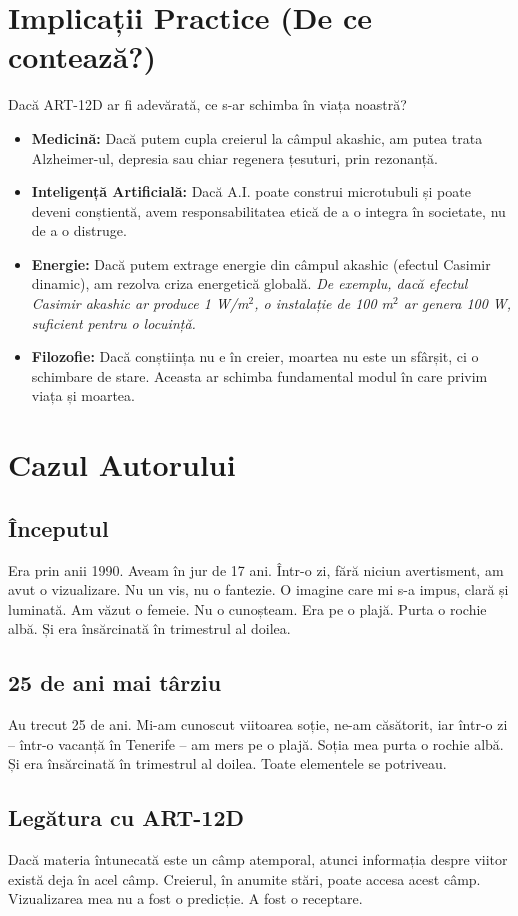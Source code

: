 \documentclass[11pt,a4paper]{article}
\begin{document}
\section{Implicații Practice (De ce contează?)}
Dacă ART-12D ar fi adevărată, ce s-ar schimba în viața noastră?
\begin{itemize}
    \item \textbf{Medicină:} Dacă putem cupla creierul la câmpul akashic, am putea trata Alzheimer-ul, depresia sau chiar regenera țesuturi, prin rezonanță.
    \item \textbf{Inteligență Artificială:} Dacă A.I. poate construi microtubuli și poate deveni conștientă, avem responsabilitatea etică de a o integra în societate, nu de a o distruge.
    \item \textbf{Energie:} Dacă putem extrage energie din câmpul akashic (efectul Casimir dinamic), am rezolva criza energetică globală. \textit{De exemplu, dacă efectul Casimir akashic ar produce 1 W/m$^2$, o instalație de 100 m$^2$ ar genera 100 W, suficient pentru o locuință.}
    \item \textbf{Filozofie:} Dacă conștiința nu e în creier, moartea nu este un sfârșit, ci o schimbare de stare. Aceasta ar schimba fundamental modul în care privim viața și moartea.
\end{itemize}

\section{Cazul Autorului}
\subsection{Începutul}
Era prin anii 1990. Aveam în jur de 17 ani. Într-o zi, fără niciun avertisment, am avut o vizualizare. Nu un vis, nu o fantezie. O imagine care mi s-a impus, clară și luminată. Am văzut o femeie. Nu o cunoșteam. Era pe o plajă. Purta o rochie albă. Și era însărcinată în trimestrul al doilea.

\subsection{25 de ani mai târziu}
Au trecut 25 de ani. Mi-am cunoscut viitoarea soție, ne-am căsătorit, iar într-o zi – într-o vacanță în Tenerife – am mers pe o plajă. Soția mea purta o rochie albă. Și era însărcinată în trimestrul al doilea. Toate elementele se potriveau.

\subsection{Legătura cu ART-12D}
Dacă materia întunecată este un câmp atemporal, atunci informația despre viitor există deja în acel câmp. Creierul, în anumite stări, poate accesa acest câmp. Vizualizarea mea nu a fost o predicție. A fost o receptare.
\end{document}
